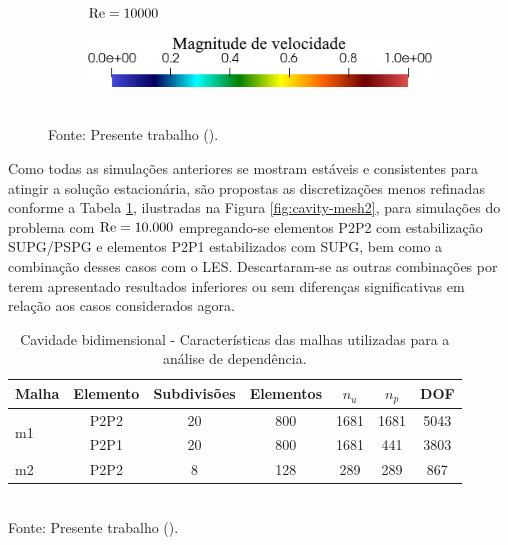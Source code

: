 \begin{figure}[h!]
\begin{subfigure}{0.32\textwidth}
        \caption{$\mathrm{Re}=10000$}
    \end{subfigure}
    \begin{subfigure}{0.4\textwidth}
        \includegraphics[width=\linewidth]{Figuras/Cavity/legenda.png}
    \end{subfigure}
    \\Fonte: Presente trabalho (\the\year).
    \label{fig:cavity-results2}
\end{figure}

Como todas as simulações anteriores se mostram estáveis e consistentes para atingir a solução estacionária, são propostas as discretizações menos refinadas conforme a Tabela \ref{tab:cavity-mesh2}, ilustradas na Figura \ref{fig:cavity-mesh2}, para simulações do problema com $\mathrm{Re}=10.000$ empregando-se elementos P2P2 com estabilização SUPG/PSPG e elementos P2P1 estabilizados com SUPG, bem como a combinação desses casos com o LES. Descartaram-se as outras combinações por terem apresentado resultados inferiores ou sem diferenças significativas em relação aos casos considerados agora.

\begin{table}[h!]
    \centering
    \caption{Cavidade bidimensional - Características das malhas utilizadas para a análise de dependência.}
    \begin{tabular}{lcccccc}
        \hline
        Malha               & Elemento & Subdivisões & Elementos & $n_u$ & $n_p$ & DOF  \\\hline
        \multirow{2}{*}{m1} & P2P2     & 20          & 800       & 1681  & 1681  & 5043 \\
                            & P2P1     & 20          & 800       & 1681  & 441   & 3803 \\\hline
        m2                  & P2P2     & 8           & 128       & 289   & 289   & 867  \\\hline
    \end{tabular}
    \\Fonte: Presente trabalho (\the\year).
    \label{tab:cavity-mesh2}
\end{table}

